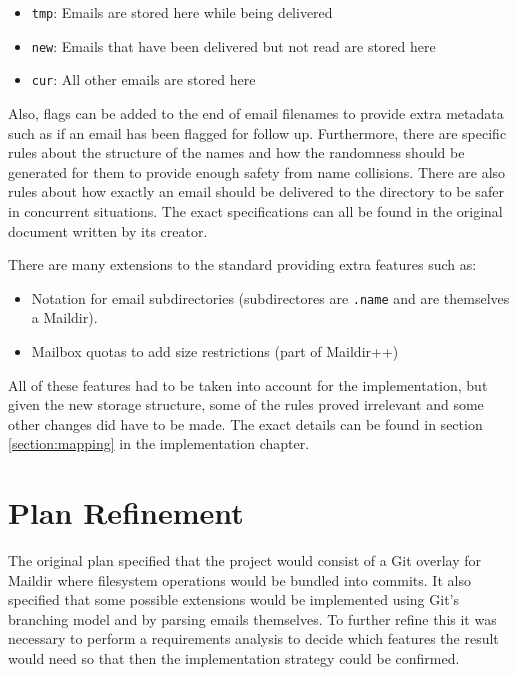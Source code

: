 \begin{itemize}
\item \texttt{tmp}: Emails are stored here while being delivered
\item \texttt{new}: Emails that have been delivered but not read are stored here
\item \texttt{cur}: All other emails are stored here
\end{itemize}

Also, flags can be added to the end of email filenames to provide extra metadata such as if an email has been flagged for follow up. Furthermore, there are specific rules about the structure of the names and how the randomness should be generated for them to provide enough safety from name collisions. There are also rules about how exactly an email should be delivered to the directory to be safer in concurrent situations. The exact specifications can all be found in the original document written by its creator\cite{bernstein2000maildir}.

There are many extensions to the standard providing extra features such as:

\begin{itemize}
\item Notation for email subdirectories (subdirectores are \texttt{.name} and are themselves a Maildir).
\item Mailbox quotas to add size restrictions (part of Maildir++)
\end{itemize}

All of these features had to be taken into account for the implementation, but given the new storage structure, some of the rules proved irrelevant and some other changes did have to be made. The exact details can be found in section \ref{section:mapping} in the implementation chapter.

\section{Plan Refinement}

The original plan specified that the project would consist of a Git overlay for Maildir where filesystem operations would be bundled into commits. It also specified that some possible extensions would be implemented using Git's branching model and by parsing emails themselves. To further refine this it was necessary to perform a requirements analysis to decide which features the result would need so that then the implementation strategy could be confirmed.

